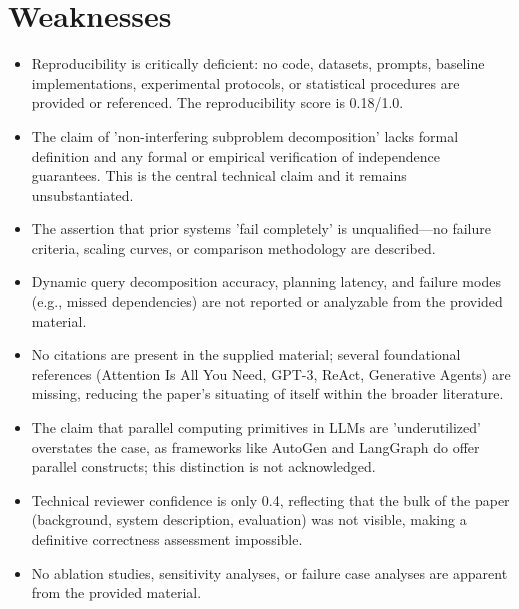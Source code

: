 \documentclass[11pt]{article}
\begin{document}
\section*{Weaknesses}
\begin{itemize}[leftmargin=*]
  \item Reproducibility is critically deficient: no code, datasets, prompts, baseline implementations, experimental protocols, or statistical procedures are provided or referenced. The reproducibility score is 0.18/1.0.
  \item The claim of 'non-interfering subproblem decomposition' lacks formal definition and any formal or empirical verification of independence guarantees. This is the central technical claim and it remains unsubstantiated.
  \item The assertion that prior systems 'fail completely' is unqualified—no failure criteria, scaling curves, or comparison methodology are described.
  \item Dynamic query decomposition accuracy, planning latency, and failure modes (e.g., missed dependencies) are not reported or analyzable from the provided material.
  \item No citations are present in the supplied material; several foundational references (Attention Is All You Need, GPT-3, ReAct, Generative Agents) are missing, reducing the paper's situating of itself within the broader literature.
  \item The claim that parallel computing primitives in LLMs are 'underutilized' overstates the case, as frameworks like AutoGen and LangGraph do offer parallel constructs; this distinction is not acknowledged.
  \item Technical reviewer confidence is only 0.4, reflecting that the bulk of the paper (background, system description, evaluation) was not visible, making a definitive correctness assessment impossible.
  \item No ablation studies, sensitivity analyses, or failure case analyses are apparent from the provided material.
\end{itemize}
\end{document}
